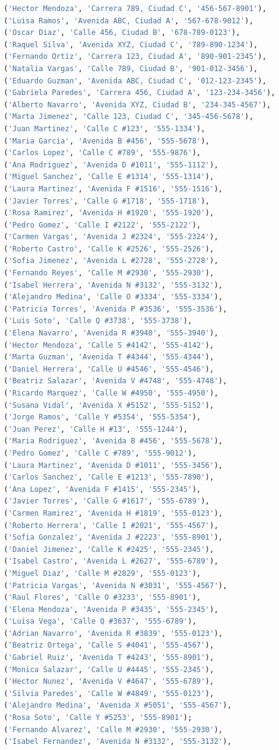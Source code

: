 \documentclass[12pt]{article}
\begin{document}
\begin{lstlisting}[language=SQL]
('Hector Mendoza', 'Carrera 789, Ciudad C', '456-567-8901'),
('Luisa Ramos', 'Avenida ABC, Ciudad A', '567-678-9012'),
('Oscar Diaz', 'Calle 456, Ciudad B', '678-789-0123'),
('Raquel Silva', 'Avenida XYZ, Ciudad C', '789-890-1234'),
('Fernando Ortiz', 'Carrera 123, Ciudad A', '890-901-2345'),
('Natalia Vargas', 'Calle 789, Ciudad B', '901-012-3456'),
('Eduardo Guzman', 'Avenida ABC, Ciudad C', '012-123-2345'),
('Gabriela Paredes', 'Carrera 456, Ciudad A', '123-234-3456'),
('Alberto Navarro', 'Avenida XYZ, Ciudad B', '234-345-4567'),
('Marta Jimenez', 'Calle 123, Ciudad C', '345-456-5678'),
('Juan Martinez', 'Calle C #123', '555-1334'),
('Maria Garcia', 'Avenida B #456', '555-5678'),
('Carlos Lopez', 'Calle C #789', '555-9876'),
('Ana Rodriguez', 'Avenida D #1011', '555-1112'),
('Miguel Sanchez', 'Calle E #1314', '555-1314'),
('Laura Martinez', 'Avenida F #1516', '555-1516'),
('Javier Torres', 'Calle G #1718', '555-1718'),
('Rosa Ramirez', 'Avenida H #1920', '555-1920'),
('Pedro Gomez', 'Calle I #2122', '555-2122'),
('Carmen Vargas', 'Avenida J #2324', '555-2324'),
('Roberto Castro', 'Calle K #2526', '555-2526'),
('Sofia Jimenez', 'Avenida L #2728', '555-2728'),
('Fernando Reyes', 'Calle M #2930', '555-2930'),
('Isabel Herrera', 'Avenida N #3132', '555-3132'),
('Alejandro Medina', 'Calle O #3334', '555-3334'),
('Patricia Torres', 'Avenida P #3536', '555-3536'),
('Luis Soto', 'Calle Q #3738', '555-3738'),
('Elena Navarro', 'Avenida R #3940', '555-3940'),
('Hector Mendoza', 'Calle S #4142', '555-4142'),
('Marta Guzman', 'Avenida T #4344', '555-4344'),
('Daniel Herrera', 'Calle U #4546', '555-4546'),
('Beatriz Salazar', 'Avenida V #4748', '555-4748'),
('Ricardo Marquez', 'Calle W #4950', '555-4950'),
('Susana Vidal', 'Avenida X #5152', '555-5152'),
('Jorge Ramos', 'Calle Y #5354', '555-5354'),
('Juan Perez', 'Calle H #13', '555-1244'),
('Maria Rodriguez', 'Avenida B #456', '555-5678'),
('Pedro Gomez', 'Calle C #789', '555-9012'),
('Laura Martinez', 'Avenida D #1011', '555-3456'),
('Carlos Sanchez', 'Calle E #1213', '555-7890'),
('Ana Lopez', 'Avenida F #1415', '555-2345'),
('Javier Torres', 'Calle G #1617', '555-6789'),
('Carmen Ramirez', 'Avenida H #1819', '555-0123'),
('Roberto Herrera', 'Calle I #2021', '555-4567'),
('Sofia Gonzalez', 'Avenida J #2223', '555-8901'),
('Daniel Jimenez', 'Calle K #2425', '555-2345'),
('Isabel Castro', 'Avenida L #2627', '555-6789'),
('Miguel Diaz', 'Calle M #2829', '555-0123'),
('Patricia Vargas', 'Avenida N #3031', '555-4567'),
('Raul Flores', 'Calle O #3233', '555-8901'),
('Elena Mendoza', 'Avenida P #3435', '555-2345'),
('Luisa Vega', 'Calle Q #3637', '555-6789'),
('Adrian Navarro', 'Avenida R #3839', '555-0123'),
('Beatriz Ortega', 'Calle S #4041', '555-4567'),
('Gabriel Ruiz', 'Avenida T #4243', '555-8901'),
('Monica Salazar', 'Calle U #4445', '555-2345'),
('Hector Nunez', 'Avenida V #4647', '555-6789'),
('Silvia Paredes', 'Calle W #4849', '555-0123'),
('Alejandro Medina', 'Avenida X #5051', '555-4567'),
('Rosa Soto', 'Calle Y #5253', '555-8901');
('Fernando Alvarez', 'Calle M #2930', '555-2930'),
('Isabel Fernandez', 'Avenida N #3132', '555-3132'),


\end{lstlisting}
\end{document}

